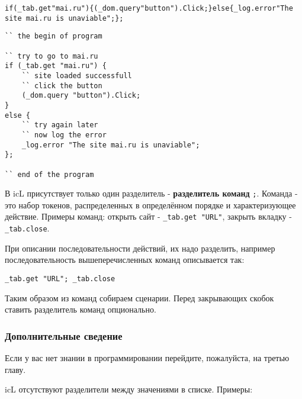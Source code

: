 \documentclass[a4paper, 14pt]{extarticle}
\begin{document}
\begin{lstlisting}[caption=Koд без пробельных символов,label=unreadable]
if(_tab.get"mai.ru"){(_dom.query"button").Click;}else{_log.error"The site mai.ru is unaviable";};
\end{lstlisting}

\begin{lstlisting}[caption=Koд с пробельных символов,label=readable]
`` the begin of program

`` try to go to mai.ru
if (_tab.get "mai.ru") {
	`` site loaded successfull
	`` click the button
	(_dom.query "button").Click;
}
else {
	`` try again later
	`` now log the error
	_log.error "The site mai.ru is unaviable";
};

`` end of the program
\end{lstlisting}

В icL присутствует только один разделитель - \textbf{разделитель команд} \lstinline`;`. Команда - это набор токенов, распределенных в определённом порядке и характеризующее действие. Примеры команд: открыть сайт - \lstinline`_tab.get "URL"`, закрыть вкладку - \lstinline`_tab.close`.

При описании последовательности действий, их надо разделить, например последовательность вышеперечисленных команд описывается так:

\begin{lstlisting}[numbers=none]
_tab.get "URL"; _tab.close
\end{lstlisting}

Таким образом из команд собираем сценарии. Перед закрывающих скобок ставить разделитель команд опционально.

\subsubsection{Дополнительные сведение}

Если у вас нет знании в программировании перейдите, пожалуйста, на третью главу.

icL отсутствуют разделители между значениями в списке. Примеры:
\end{document}
